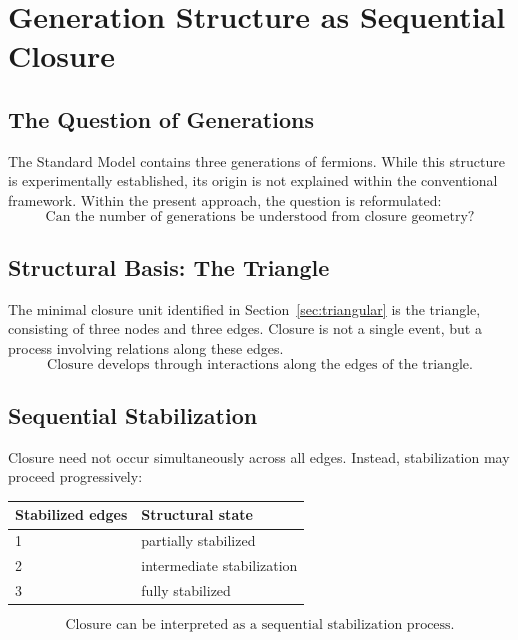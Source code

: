 \section{Generation Structure as Sequential Closure}
\label{sec:generations}

\subsection{The Question of Generations}

The Standard Model contains three generations of fermions.
While this structure is experimentally established,
its origin is not explained within the conventional framework.
Within the present approach, the question is reformulated:
\begin{equation}
  \boxed{
    \text{Can the number of generations be understood from closure geometry?}
  }
\end{equation}

\subsection{Structural Basis: The Triangle}

The minimal closure unit identified in Section~\ref{sec:triangular}
is the triangle, consisting of three nodes and three edges.
Closure is not a single event, but a process involving relations along these edges.
\begin{equation}
  \boxed{
    \text{Closure develops through interactions along the edges of the triangle.}
  }
\end{equation}

\subsection{Sequential Stabilization}

Closure need not occur simultaneously across all edges.
Instead, stabilization may proceed progressively:
\begin{center}
\begin{tabular}{ll}
\toprule
Stabilized edges & Structural state \\
\midrule
1 & partially stabilized \\
2 & intermediate stabilization \\
3 & fully stabilized \\
\bottomrule
\end{tabular}
\end{center}
\begin{equation}
  \boxed{\text{Closure can be interpreted as a sequential stabilization process.}}
\end{equation}

